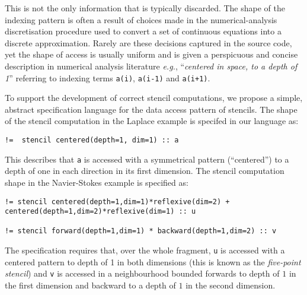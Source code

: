 \documentclass{article}
\newcommand{\eg}{\emph{e.g.}}
\begin{document}
This is not the only information that is typically discarded. The
shape of the indexing pattern is often a result of choices made in the
numerical-analysis discretisation procedure used to convert a set of
continuous equations into a discrete approximation. Rarely are these
decisions captured in the source code, yet the shape of access is
usually uniform and is given a perspicuous and concise description in
numerical analysis literature \eg{}, ``\emph{centered in space, to a
  depth of 1}'' referring to indexing terms \texttt{a(i)},
\texttt{a(i-1)} and \texttt{a(i+1)}.

To support the development of correct stencil computations, we propose
a simple, abstract specification language for the data access pattern
of stencils. The shape of the stencil computation in the
Laplace example is specifed in our language as:
%
\begin{verbatim}
!=  stencil centered(depth=1, dim=1) :: a
\end{verbatim}
%
This describes that \texttt{a} is accessed with a symmetrical pattern
(``centered'') to a depth of one in each direction in its first
dimension.  The stencil computation shape in the Navier-Stokes example
is specified as:
%
\begin{verbatim}
!= stencil centered(depth=1,dim=1)*reflexive(dim=2) + centered(depth=1,dim=2)*reflexive(dim=1) :: u

!= stencil forward(depth=1,dim=1) * backward(depth=1,dim=2) :: v
\end{verbatim}
%
The specification requires that, over the whole fragment, \texttt{u}
is accessed with a centered pattern to depth of 1 in both dimensions
(this is known as the \emph{five-point stencil}) and \texttt{v} is
accessed in a neighbourhood bounded forwards to depth of $1$ in the
first dimension and backward to a depth of $1$ in the second
dimension.
\end{document}
